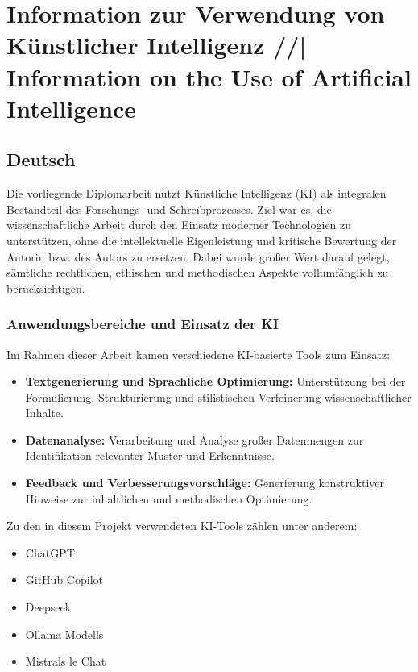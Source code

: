 \chapter{Information zur Verwendung von Künstlicher Intelligenz //| Information on the Use of Artificial Intelligence}
\label{cha:Use-of-AI}

\section*{Deutsch}
Die vorliegende Diplomarbeit nutzt Künstliche Intelligenz (KI) als integralen Bestandteil des Forschungs- und Schreibprozesses. Ziel war es, die wissenschaftliche Arbeit durch den Einsatz moderner Technologien zu unterstützen, ohne die intellektuelle Eigenleistung und kritische Bewertung der Autorin bzw. des Autors zu ersetzen. Dabei wurde großer Wert darauf gelegt, sämtliche rechtlichen, ethischen und methodischen Aspekte vollumfänglich zu berücksichtigen.

\subsection*{Anwendungsbereiche und Einsatz der KI}
Im Rahmen dieser Arbeit kamen verschiedene KI-basierte Tools zum Einsatz:
\begin{itemize}
    \item \textbf{Textgenerierung und Sprachliche Optimierung:} Unterstützung bei der Formulierung, Strukturierung und stilistischen Verfeinerung wissenschaftlicher Inhalte. 
    \item \textbf{Datenanalyse:} Verarbeitung und Analyse großer Datenmengen zur Identifikation relevanter Muster und Erkenntnisse.
    \item \textbf{Feedback und Verbesserungsvorschläge:} Generierung konstruktiver Hinweise zur inhaltlichen und methodischen Optimierung.
\end{itemize}

\newpage

Zu den in diesem Projekt verwendeten KI-Tools zählen unter anderem:
\begin{itemize}
    \item ChatGPT
    \item GitHub Copilot
    \item Deepseek
    \item Ollama Modells
    \item Mistrals le Chat
\end{itemize}

